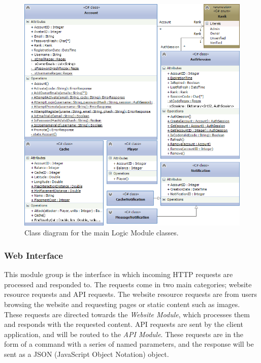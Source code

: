 \begin{figure}[h!]
    \centering
    \includegraphics[width=\textwidth]{svlogiccd}
    \caption{Class diagram for the main Logic Module classes.}
\end{figure}

\subsubsection{Web Interface}
This module group is the interface in which incoming HTTP requests are processed and responded to. The requests come in two main categories; website resource requests and API requests. The website resource requests are from users browsing the website and requesting pages or static content such as images. These requests are directed towards the \emph{Website Module}, which processes them and responds with the requested content. API requests are sent by the client application, and will be routed to the \emph{API Module}. These requests are in the form of a command with a series of named parameters, and the response will be sent as a JSON (JavaScript Object Notation) object.

